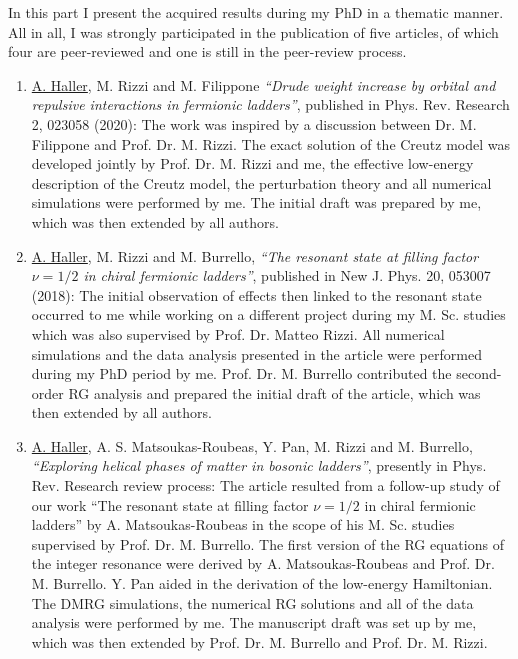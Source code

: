 
In this part I present the acquired results during my PhD in a thematic manner.
All in all, I was strongly participated in the publication of five articles, of which four are peer-reviewed and one is still in the peer-review process.

\begin{enumerate}
    \item{\underline{A. Haller}, M. Rizzi and M. Filippone {\it ``Drude weight increase by orbital and repulsive interactions in fermionic ladders''}, published in Phys. Rev. Research 2, 023058 (2020):
    The work was inspired by a discussion between Dr. M. Filippone and Prof. Dr. M. Rizzi. The exact solution of the Creutz model was developed jointly by Prof. Dr. M. Rizzi and me, the effective low-energy description of the Creutz model, the perturbation theory and all numerical simulations were performed by me. The initial draft was prepared by me, which was then extended by all authors.}
    \item{\underline{A. Haller}, M. Rizzi and M. Burrello, {\it ``The resonant state at filling factor $\nu=1/2$ in chiral fermionic ladders''}, published in New J. Phys. 20, 053007 (2018): The initial observation of effects then linked to the resonant state occurred to me while working on a different project during my M. Sc. studies which was also supervised by Prof. Dr. Matteo Rizzi. All numerical simulations and the data analysis presented in the article were performed during my PhD period by me. Prof. Dr. M. Burrello contributed the second-order RG analysis and prepared the initial draft of the article, which was then extended by all authors.}
    \item{\underline{A. Haller}, A. S. Matsoukas-Roubeas, Y. Pan, M. Rizzi and M. Burrello, {\it ``Exploring helical phases of matter in bosonic ladders''}, presently in Phys. Rev. Research review process:
    The article resulted from a follow-up study of our work ``The resonant state at filling factor $\nu=1/2$ in chiral fermionic ladders'' by A. Matsoukas-Roubeas in the scope of his M. Sc. studies supervised by Prof. Dr. M. Burrello. The first version of the RG equations of the integer resonance were derived by A. Matsoukas-Roubeas and Prof. Dr. M. Burrello. Y. Pan aided in the derivation of the low-energy Hamiltonian. The DMRG simulations, the numerical RG solutions and all of the data analysis were performed by me. The manuscript draft was set up by me, which was then extended by Prof. Dr. M. Burrello and Prof. Dr. M. Rizzi.}

\end{enumerate}
